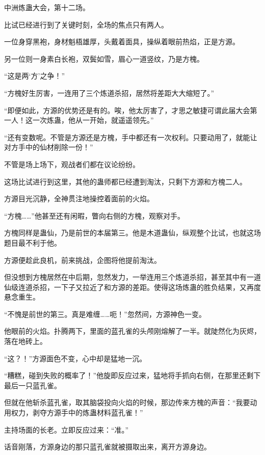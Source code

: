 
\begin{this_body}

中洲炼蛊大会，第十二场。

比试已经进行到了关键时刻，全场的焦点只有两人。

一位身穿黑袍，身材魁梧雄厚，头戴着面具，操纵着眼前热焰，正是方源。

另一位则一身素白长袍，双鬓如雪，眉心一道竖纹，乃是方槐。

“这是两‘方’之争！”

“方槐好生厉害，一连用了三个炼道杀招，居然将差距大大缩短了。”

“即便如此，方源的优势还是有的。唉，他太厉害了，才思之敏捷可谓此届大会第一人！这一次炼蛊，他从一开始，就遥遥领先。”

“还有变数呢。不管是方源还是方槐，手中都还有一次权利。只要动用了，就能让对方手中的仙材削除一份！”

不管是场上场下，观战者们都在议论纷纷。

这场比试进行到这里，其他的蛊师都已经遭到淘汰，只剩下方源和方槐二人。

方源目光沉静，全神贯注地操控着面前的火焰。

“方槐……”他甚至还有闲暇，瞥向右侧的方槐，观察对手。

方槐同样是蛊仙，乃是前世的本届第三。他是木道蛊仙，纵观整个比试，也就这场题目最不利于他。

方源便趁此良机，前来挑战，企图将他提前淘汰。

但没想到方槐居然在中后期，忽然发力，一举连用三个炼道杀招，甚至其中有一道仙级连道杀招，一下子又拉近了和方源的差距。使得这场炼蛊的胜负结果，又再度悬念重生。

“不愧是前世的第三。真是难缠……呃！”忽然间，方源神色一变。

他眼前的火焰。扑腾两下，里面的蓝孔雀的头颅刚熔解了一半。就陡然化为灰烬，落在地砖上。

“这？！”方源面色不变，心中却是猛地一沉。

“糟糕，碰到失败的概率了！”他旋即反应过来，猛地将手抓向右侧，在那里还剩下最后一只蓝孔雀。

但就在他斩杀蓝孔雀，取其脑袋投向火焰的时候，那边传来方槐的声音：“我要动用权力，剥夺方源手中的炼蛊材料蓝孔雀！”

主持场面的长老。立即反应过来：“准。”

话音刚落，方源身边的那只蓝孔雀就被摄取出来，离开方源身边。


\end{this_body}
